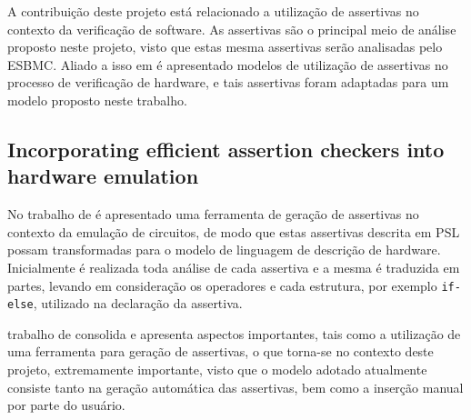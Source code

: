 \par
A contribuição deste projeto está relacionado a utilização de assertivas no contexto da verificação de software. As assertivas são o principal meio de análise proposto neste projeto, visto que estas mesma assertivas serão analisadas pelo ESBMC. Aliado a isso em \citeauthor{di2012use} é apresentado modelos de utilização de assertivas no processo de verificação de hardware, e tais assertivas foram adaptadas para um modelo proposto neste trabalho.

\subsection{Incorporating efficient assertion checkers into hardware emulation}

No trabalho de \citeauthor{boule2005incorporating} é apresentado uma ferramenta de geração de assertivas no contexto da emulação de circuitos, de modo que estas assertivas descrita em PSL possam transformadas para o modelo de linguagem de descrição de hardware. Inicialmente é realizada toda análise de cada assertiva e a mesma é traduzida em partes, levando em consideração os operadores e cada estrutura, por exemplo \texttt{if-else}, utilizado na declaração da assertiva.


\par
trabalho de \citeauthor{boule2005incorporating} consolida e apresenta aspectos importantes, tais como a utilização de uma ferramenta para geração de assertivas, o que torna-se no contexto deste projeto, extremamente importante, visto que o modelo adotado atualmente consiste tanto na geração automática das assertivas, bem como a inserção manual por parte do usuário.